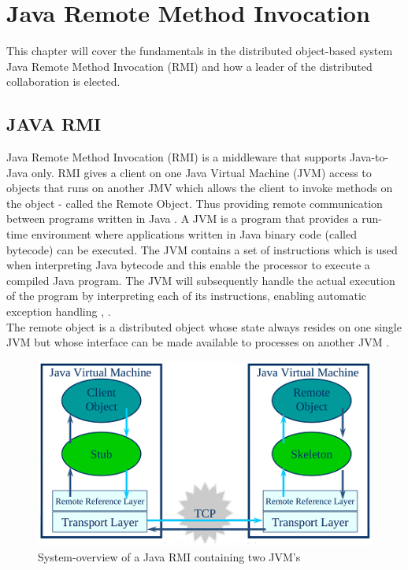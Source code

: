 \documentclass[Main]{subfiles}
\begin{document}
\chapter{Java Remote Method Invocation}
This chapter will cover the fundamentals in the distributed object-based system Java Remote Method Invocation (RMI) and how a leader of the distributed collaboration is elected.

\section{JAVA RMI}
Java Remote Method Invocation (RMI) is a middleware that supports Java-to-Java only. RMI gives a client on one Java Virtual Machine (JVM) access to objects that runs on another JMV which allows the client to invoke methods on the object - called the Remote Object. Thus providing remote communication between programs written in Java \cite{RMI-slides}. A JVM is a program that provides a run-time environment where applications written in Java binary code (called bytecode) can be executed. The JVM contains a set of instructions which is used when interpreting Java bytecode and this enable the processor to execute a compiled Java program. The JVM will subsequently handle the actual execution of the program by interpreting each of its instructions, enabling automatic exception handling \cite[p. 422-423]{Tanenbaum}, \cite{wiki-jvm}.\\The remote object is a distributed object whose state always resides on one single JVM but whose interface can be made available to processes on another JVM \cite[p. 461]{Tanenbaum}.

\begin{figure}[H]
\centering
\includegraphics[scale=0.8]{Figurer/JVM.png}
\caption{System-overview of a Java RMI containing two JVM's \cite{RMI-slides}}
\label{Figure-jvm}
\end{figure}
\end{document}

